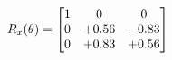 \documentclass[preview]{standalone}
\begin{document}
\begin{align*}
\special{dvisvgm:raw <g id='unique000'>}R_{x}(\theta) = \begin{bmatrix}1 & 0 & 0 \\0 & +0.56 & -0.83 \\0 & +0.83 & +0.56\end{bmatrix}\special{dvisvgm:raw </g>}
\end{align*}
\end{document}
